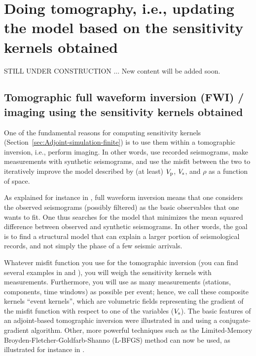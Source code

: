 \chapter[Doing tomography based on the sensitivity kernels obtained]{Doing tomography, i.e., updating the model based on the sensitivity kernels obtained}\label{cha:tomo}

\newline

STILL UNDER CONSTRUCTION ... New content will be added soon.

\section{Tomographic full waveform inversion (FWI) / imaging using the sensitivity kernels obtained}

One of the fundamental reasons for computing sensitivity kernels (Section~\ref{sec:Adjoint-simulation-finite})
is to use them within a tomographic inversion, i.e., perform imaging. In other words, use
recorded seismograms, make measurements with synthetic seismograms,
and use the misfit between the two to iteratively improve the model
described by (at least) $V_{{\rm p}}$, $V_{{\rm s}}$, and $\rho$ as a function of space.\newline


As explained for instance in \cite{MoChKoWa15},
full waveform inversion means that one considers the observed seismograms (possibly filtered) as the
basic observables that one wants to fit. One thus searches for the model that minimizes the mean squared difference between observed
and synthetic seismograms. In other words, the goal is to find a structural model that can explain a larger portion
of seismological records, and not simply the phase of a few seismic arrivals.\newline


Whatever misfit function you use for the tomographic inversion (you can find several
examples in \citet{TrKoLi08} and \citet{TrTaLi05}), you will weigh
the sensitivity kernels with measurements. Furthermore, you will use
as many measurements (stations, components, time windows) as possible
per event; hence, we call these composite kernels ``event kernels'',
which are volumetric fields representing the gradient of the misfit
function with respect to one of the variables (\eg $V_{{\rm s}}$).
The basic features of an adjoint-based tomographic inversion were
illustrated in \citet{TrKoLi08} and \citet{TaLiTr07} using a conjugate-gradient algorithm.
Other, more powerful techniques such as the Limited-Memory Broyden-Fletcher-Goldfarb-Shanno (L-BFGS) method can now be used,
as illustrated for instance in \cite{MoChKoWa15}.


